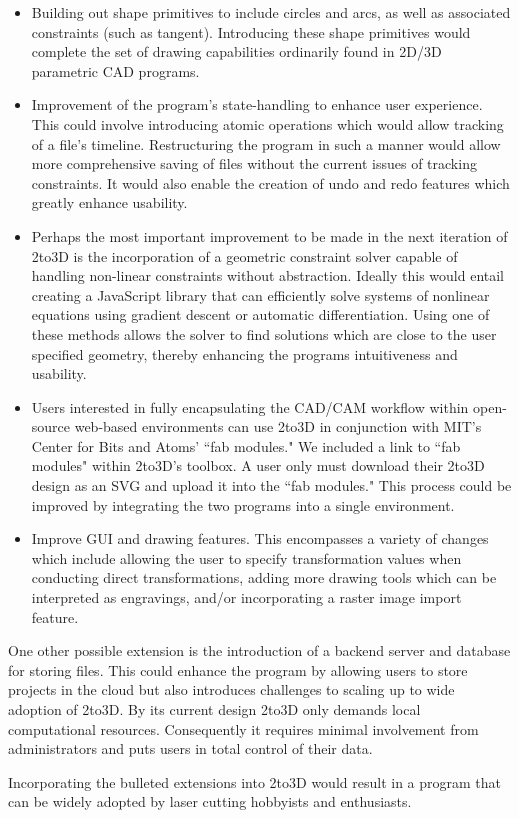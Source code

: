 \begin{itemize}
  \item Building out shape primitives to include circles and arcs, as well as associated constraints (such as tangent). Introducing these shape primitives would complete the set of drawing capabilities ordinarily found in 2D/3D parametric CAD programs.

  \item Improvement of the program's state-handling to enhance user experience. This could involve introducing atomic operations which would allow tracking of a file's timeline. Restructuring the program in such a manner would allow more comprehensive saving of files without the current issues of tracking constraints. It would also enable the creation of undo and redo features which greatly enhance usability.

  \item Perhaps the most important improvement to be made in the next iteration of 2to3D is the incorporation of a geometric constraint solver capable of handling non-linear constraints without abstraction. Ideally this would entail creating a JavaScript library that can efficiently solve systems of nonlinear equations using gradient descent or automatic differentiation. Using one of these methods allows the solver to find solutions which are close to the user specified geometry, thereby enhancing the programs intuitiveness and usability.

  \item Users interested in fully encapsulating the CAD/CAM workflow within open-source web-based environments can use 2to3D in conjunction with MIT's Center for Bits and Atoms' ``fab modules." We included a link to ``fab modules" within 2to3D's toolbox. A user only must download their 2to3D design as an SVG and upload it into the ``fab modules." This process could be improved by integrating the two programs into a single environment.
  
  \item Improve GUI and drawing features. This encompasses a variety of changes which include allowing the user to specify transformation values when conducting direct transformations, adding more drawing tools which can be interpreted as engravings, and/or incorporating a raster image import feature.
\end{itemize}

One other possible extension is the introduction of a backend server and database for storing files. This could enhance the program by allowing users to store projects in the cloud but also introduces challenges to scaling up to wide adoption of 2to3D. By its current design 2to3D only demands local computational resources. Consequently it requires minimal involvement from administrators and puts users in total control of their data. 

Incorporating the bulleted extensions into 2to3D would result in a program that can be widely adopted by laser cutting hobbyists and enthusiasts.


